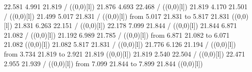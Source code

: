 {{\color[rgb]{0,0,0} 22.581  4.991 21.819 /
}%
%
%
\linethickness=1pt
\setplotsymbol ({\makebox(0,0)[l]{\tencirc{}}})
{\color[rgb]{0,0,0} 21.876  4.693 22.468 /
}%
%
%
\linethickness=1pt
\setplotsymbol ({\makebox(0,0)[l]{\tencirc{}}})
{\color[rgb]{0,0,0} 21.819  4.170 21.501 /
}%
%
%
\linethickness=1pt
\setplotsymbol ({\makebox(0,0)[l]{\tencirc{}}})
{\color[rgb]{0,0,0} 21.499  5.017 21.831 /
}%
%
%
\linethickness=1pt
\setplotsymbol ({\makebox(0,0)[l]{\tencirc{}}})
{\color[rgb]{0,0,0}\putrule from  5.017 21.831 to  5.817 21.831
}%
%
%
\linethickness=1pt
\setplotsymbol ({\makebox(0,0)[l]{\tencirc{}}})
{\color[rgb]{0,0,0} 21.831  6.263 22.151 /
}%
%
%
\linethickness=1pt
\setplotsymbol ({\makebox(0,0)[l]{\tencirc{}}})
{\color[rgb]{0,0,0} 22.178  7.099 21.844 /
}%
%
%
\linethickness=1pt
\setplotsymbol ({\makebox(0,0)[l]{\tencirc{}}})
{\color[rgb]{0,0,0} 21.844  6.871 21.082 /
}%
%
%
\linethickness=1pt
\setplotsymbol ({\makebox(0,0)[l]{\tencirc{}}})
{\color[rgb]{0,0,0} 21.192  6.989 21.785 /
}%
%
%
\linethickness=1pt
\setplotsymbol ({\makebox(0,0)[l]{\tencirc{}}})
{\color[rgb]{0,0,0}\putrule from  6.871 21.082 to  6.071 21.082
}%
%
%
\linethickness=1pt
\setplotsymbol ({\makebox(0,0)[l]{\tencirc{}}})
{\color[rgb]{0,0,0} 21.082  5.817 21.831 /
}%
%
%
\linethickness=1pt
\setplotsymbol ({\makebox(0,0)[l]{\tencirc{}}})
{\color[rgb]{0,0,0} 21.776  6.126 21.194 /
}%
%
%
\linethickness=1pt
\setplotsymbol ({\makebox(0,0)[l]{\tencirc{}}})
{\color[rgb]{0,0,0}\putrule from  3.734 21.819 to  2.921 21.819
}%
%
%
\linethickness=1pt
\setplotsymbol ({\makebox(0,0)[l]{\tencirc{}}})
{\color[rgb]{0,0,0} 21.819  2.540 22.504 /
}%
%
%
\linethickness=1pt
\setplotsymbol ({\makebox(0,0)[l]{\tencirc{}}})
{\color[rgb]{0,0,0} 22.471  2.955 21.939 /
}%
%
%
\linethickness=1pt
\setplotsymbol ({\makebox(0,0)[l]{\tencirc{}}})
{\color[rgb]{0,0,0}\putrule from  7.099 21.844 to  7.899 21.844
}%
%
%
\linethickness=1pt
\setplotsymbol ({\makebox(0,0)[l]{\tencirc{}}})
}
